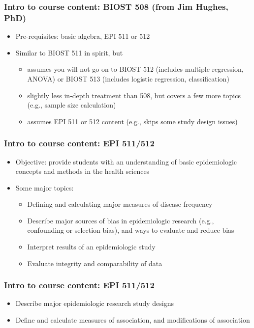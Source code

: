 \documentclass[12pt]{beamer}
\newcommand{\myframe}[1]{\begin{frame} \frametitle{#1}}
\newenvironment{spaceitemize}
{ \begin{itemize}
    \setlength{\itemsep}{10pt}
    \setlength{\parskip}{0pt}
    \setlength{\parsep}{0pt}     }
{ \end{itemize}                  }
\begin{document}
\myframe{Intro to course content: BIOST 508 \small (from Jim Hughes, PhD)}
\begin{spaceitemize}
\item Pre-requisites: basic algebra, EPI 511 or 512
\item Similar to BIOST 511 in spirit, but 
\begin{spaceitemize}
\item assumes you will not go on to BIOST 512 (includes multiple regression, ANOVA) or BIOST 513 (includes logistic regression, classification)
\item slightly less in-depth treatment than 508, but covers a few more topics (e.g., sample size calculation)
\item assumes EPI 511 or 512 content (e.g., skips some study design issues)
\end{spaceitemize}
\end{spaceitemize}
\end{frame}
\myframe{Intro to course content: EPI 511/512}
\begin{spaceitemize}
\item Objective: provide students with an understanding of basic epidemiologic concepts and methods in the health sciences 
\item Some major topics:
\begin{spaceitemize}
\item Defining and calculating major measures of disease frequency
\item Describe major sources of bias in epidemiologic research (e.g., confounding or selection bias), and ways to evaluate and reduce bias
\item Interpret results of an epidemiologic study
\item Evaluate integrity and comparability of data
\end{spaceitemize}
\end{spaceitemize}
\end{frame}

\myframe{Intro to course content: EPI 511/512}
\begin{spaceitemize}
\item Describe major epidemiologic research study designs
\item Define and calculate measures of association, and modifications of association
\end{spaceitemize}
\end{frame}
\end{document}
